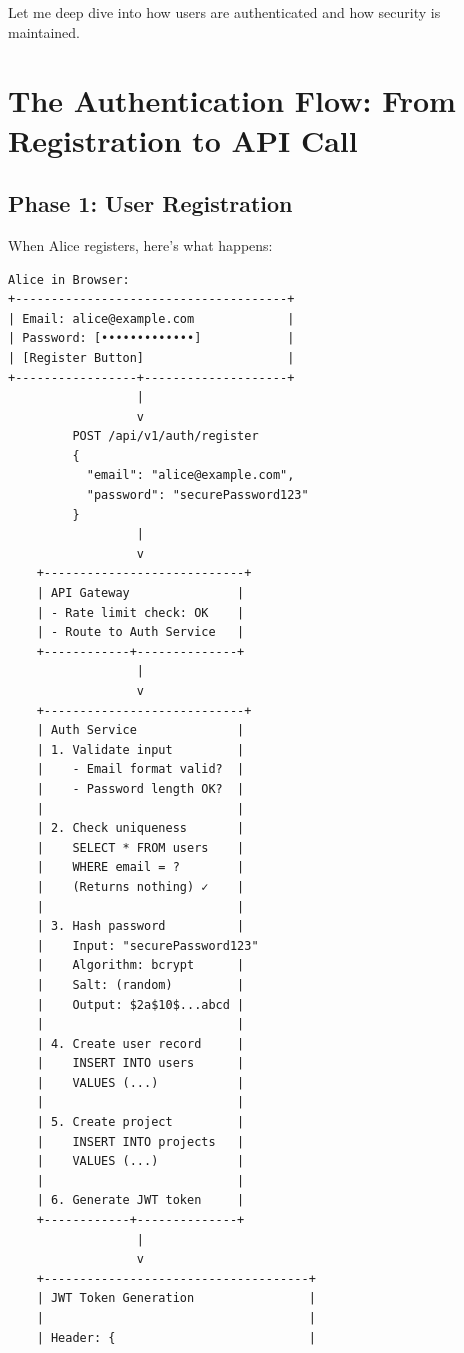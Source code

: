 \documentclass[11pt,a4paper]{report}
\begin{document}
Let me deep dive into how users are authenticated and how security is maintained.


\chapter{The Authentication Flow: From Registration to API Call}



\section{Phase 1: User Registration}


When Alice registers, here's what happens:

\begin{lstlisting}[language=text]
Alice in Browser:
+--------------------------------------+
| Email: alice@example.com             |
| Password: [•••••••••••••]            |
| [Register Button]                    |
+-----------------+--------------------+
                  |
                  v
         POST /api/v1/auth/register
         {
           "email": "alice@example.com",
           "password": "securePassword123"
         }
                  |
                  v
    +----------------------------+
    | API Gateway               |
    | - Rate limit check: OK    |
    | - Route to Auth Service   |
    +------------+--------------+
                  |
                  v
    +----------------------------+
    | Auth Service              |
    | 1. Validate input         |
    |    - Email format valid?  |
    |    - Password length OK?  |
    |                           |
    | 2. Check uniqueness       |
    |    SELECT * FROM users    |
    |    WHERE email = ?        |
    |    (Returns nothing) ✓    |
    |                           |
    | 3. Hash password          |
    |    Input: "securePassword123"
    |    Algorithm: bcrypt      |
    |    Salt: (random)         |
    |    Output: $2a$10$...abcd |
    |                           |
    | 4. Create user record     |
    |    INSERT INTO users      |
    |    VALUES (...)           |
    |                           |
    | 5. Create project         |
    |    INSERT INTO projects   |
    |    VALUES (...)           |
    |                           |
    | 6. Generate JWT token     |
    +------------+--------------+
                  |
                  v
    +-------------------------------------+
    | JWT Token Generation                |
    |                                     |
    | Header: {                           |

\end{lstlisting}
\end{document}

